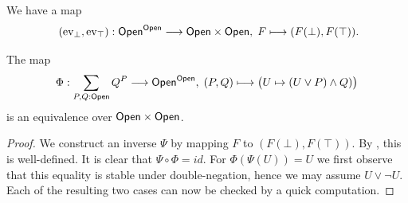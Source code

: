 We have a map
\[
  (\mathrm{ev}_\bot, \mathrm{ev}_\top) : \Open^{\Open} \longrightarrow \Open \times \Open, \;
  F \longmapsto (F(\bot),F(\top)) \rlap{.}
\]


\begin{proposition}
  The map
  \[
    \Phi :
    \sum_{P,Q: \mathsf{Open}}Q^P
    \longrightarrow
    \mathsf{Open}^{\mathsf{Open}}, \;
    (P,Q) \longmapsto \big(U \mapsto (U \lor P) \land Q) \big)
  \]
  is an equivalence over $\mathsf{Open} \times \mathsf{Open}$.
\end{proposition}

\begin{proof}
  We construct an inverse $\Psi$ by mapping $F$ to $(F(\bot), F(\top))$.
  By , this is well-defined.
  It is clear that $\Psi \circ \Phi = id$. For $\Phi(\Psi(U)) = U$ we first observe that this equality is stable under double-negation, hence we may assume $U \lor \neg U$.
  Each of the resulting two cases can now be checked by a quick computation.
\end{proof}
